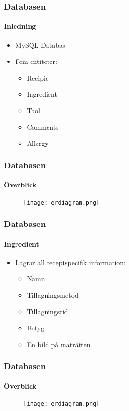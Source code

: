 
\begin{frame}
  \frametitle{Databasen}
  \framesubtitle{Inledning}
  \begin{itemize}
    \item<1-> MySQL Databas
    \item<2-> Fem entiteter:
      \begin{itemize}
      \item<3-> Recipie
      \item<4-> Ingredient
      \item<5-> Tool
      \item<6-> Comments
      \item<7-> Allergy
      \end{itemize}
  \end{itemize}
\end{frame}


\begin{frame}
  \frametitle{Databasen}
  \framesubtitle{Överblick}
  \begin{figure}[H]
        \centering 
        \texttt{[image: erdiagram.png]} 
        \label{fig:erdiagram}
\end{figure}
\end{frame}


\begin{frame}[c]
  \frametitle{Databasen}
  \framesubtitle{Ingredient}
  \begin{itemize}
    \item<1-> Lagrar all receptspecifik information:
      \begin{itemize}
        \item Namn 
        \item Tillagningsmetod
        \item Tillagningstid
        \item Betyg
        \item En bild på maträtten
      \end{itemize}
 \end{itemize}
\end{frame}


\begin{frame}[c]
  \frametitle{Databasen}
  \framesubtitle{Överblick}
  \begin{figure}[H]
        \centering 
        \texttt{[image: erdiagram.png]} 
        \label{fig:erdiagram}
\end{figure}
\end{frame}

